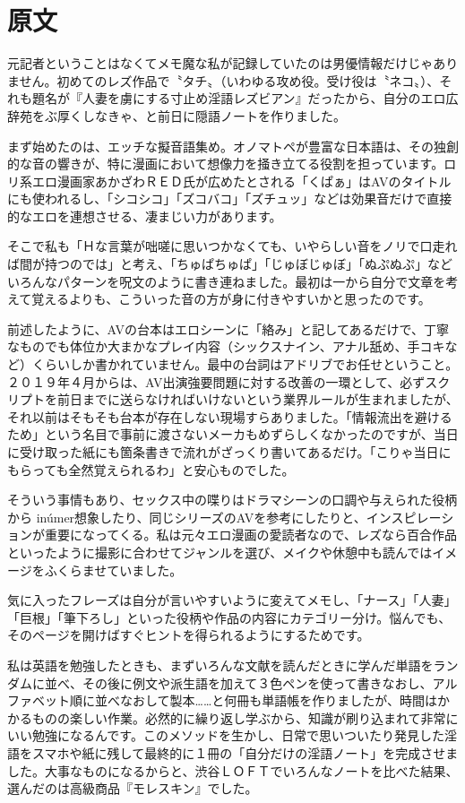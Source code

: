 \documentclass[12pt,UTF8]{ctexbook}
\begin{document}
\switchcolumn

\section*{原文}

元記者ということはなくてメモ魔な私が記録していたのは男優情報だけじゃありません。初めてのレズ作品で〝タチ〟（いわゆる攻め役。受け役は〝ネコ〟）、それも題名が『人妻を虜にする寸止め淫語レズビアン』だったから、自分のエロ広辞苑をぶ厚くしなきゃ、と前日に隠語ノートを作りました。

まず始めたのは、エッチな擬音語集め。オノマトペが豊富な日本語は、その独創的な音の響きが、特に漫画において想像力を掻き立てる役割を担っています。ロリ系エロ漫画家あかざわＲＥＤ氏が広めたとされる「くぱぁ」はAVのタイトルにも使われるし、「シコシコ」「ズコバコ」「ズチュッ」などは効果音だけで直接的なエロを連想させる、凄まじい力があります。

そこで私も「Ｈな言葉が咄嗟に思いつかなくても、いやらしい音をノリで口走れば間が持つのでは」と考え、「ちゅぱちゅぱ」「じゅぼじゅぼ」「ぬぷぬぷ」などいろんなパターンを呪文のように書き連ねました。最初は一から自分で文章を考えて覚えるよりも、こういった音の方が身に付きやすいかと思ったのです。

前述したように、AVの台本はエロシーンに「絡み」と記してあるだけで、丁寧なものでも体位か大まかなプレイ内容（シックスナイン、アナル舐め、手コキなど）くらいしか書かれていません。最中の台詞はアドリブでお任せということ。２０１９年４月からは、AV出演強要問題に対する改善の一環として、必ずスクリプトを前日までに送らなければいけないという業界ルールが生まれましたが、それ以前はそもそも台本が存在しない現場すらありました。「情報流出を避けるため」という名目で事前に渡さないメーカもめずらしくなかったのですが、当日に受け取った紙にも箇条書きで流れがざっくり書いてあるだけ。「こりゃ当日にもらっても全然覚えられるわ」と安心ものでした。

そういう事情もあり、セックス中の喋りはドラマシーンの口調や与えられた役柄から inúmer想象したり、同じシリーズのAVを参考にしたりと、インスピレーションが重要になってくる。私は元々エロ漫画の愛読者なので、レズなら百合作品といったように撮影に合わせてジャンルを選び、メイクや休憩中も読んではイメージをふくらませていました。

気に入ったフレーズは自分が言いやすいように変えてメモし、「ナース」「人妻」「巨根」「筆下ろし」といった役柄や作品の内容にカテゴリー分け。悩んでも、そのページを開けばすぐヒントを得られるようにするためです。

私は英語を勉強したときも、まずいろんな文献を読んだときに学んだ単語をランダムに並べ、その後に例文や派生語を加えて３色ペンを使って書きなおし、アルファベット順に並べなおして製本……と何冊も単語帳を作りましたが、時間はかかるものの楽しい作業。必然的に繰り返し学ぶから、知識が刷り込まれて非常にいい勉強になるんです。このメソッドを生かし、日常で思いついたり発見した淫語をスマホや紙に残して最終的に１冊の「自分だけの淫語ノート」を完成させました。大事なものになるからと、渋谷ＬＯＦＴでいろんなノートを比べた結果、選んだのは高級商品『モレスキン』でした。
\end{document}
